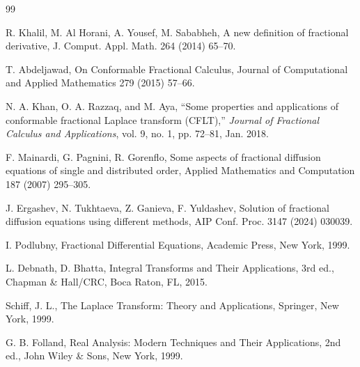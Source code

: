 \documentclass[two side,reqno,12pt]{amsart}
\numberwithin{equation}{section}
\theoremstyle{definition}
\begin{document}
\begin{thebibliography}{99}

	R. Khalil, M. Al Horani, A. Yousef, M. Sababheh, A new definition of fractional derivative, J. Comput. Appl. Math. 264 (2014) 65–70.
	
	T. Abdeljawad, On Conformable Fractional Calculus, Journal of Computational and Applied Mathematics 279 (2015) 57–66.

     N. A. Khan, O. A. Razzaq, and M. Aya,
    ``Some properties and applications of conformable fractional   Laplace transform (CFLT),''
    \emph{Journal of Fractional Calculus and Applications},
      vol. 9, no. 1, pp. 72--81, Jan. 2018.

	F. Mainardi, G. Pagnini, R. Gorenflo, Some aspects of fractional diffusion equations of single and distributed order, Applied Mathematics and Computation 187 (2007) 295–305.


	J. Ergashev, N. Tukhtaeva, Z. Ganieva, F. Yuldashev, Solution of fractional diffusion equations using different methods, AIP Conf. Proc. 3147 (2024) 030039.


	I. Podlubny, Fractional Differential Equations, Academic Press, New York, 1999.

	L. Debnath, D. Bhatta, Integral Transforms and Their Applications, 3rd ed., Chapman \& Hall/CRC, Boca Raton, FL, 2015.

    Schiff, J. L., The Laplace Transform: Theory and Applications, Springer, New York, 1999.
    
    G. B. Folland, Real Analysis: Modern Techniques and Their Applications, 2nd ed., John Wiley \& Sons, New York, 1999.

	
	\end{thebibliography}
\end{document}
